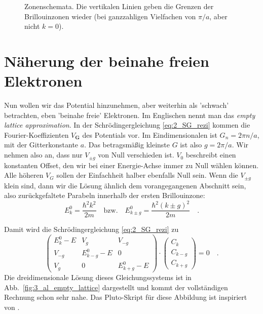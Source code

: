 \begin{figure}
   \caption{Zonenschemata. Die vertikalen Linien geben die Grenzen der Brillouinzonen wieder (bei ganzzahligen Vielfachen von $\pi/a$, aber nicht $k=0$). \label{fig:3_zone_scheme}}
\end{figure}


\section{Näherung der beinahe freien Elektronen}



Nun wollen wir das Potential hinzunehmen, aber weiterhin als 'schwach' betrachten, eben 'beinahe freie' Elektronen. Im Englischen  nennt man das \emph{empty lattice approximation}. In der Schrödingergleichung \ref{eq:2_SG_rezi} kommen die Fourier-Koeffizienten $V_\mathbf{G}$ des Potentials vor. Im Eindimensionalen ist $G_n = 2 \pi n / a$, mit der Gitterkonstante $a$. Das betragsmäßig kleinste $G$ ist also $g = 2 \pi / a$. Wir nehmen also an, dass nur $V_{\pm g}$ von Null verschieden ist. $V_0$ beschreibt einen konstanten Offset, den wir bei einer Energie-Achse immer zu Null wählen können. Alle höheren $V_G$ sollen der Einfachheit halber ebenfalls Null sein.  Wenn die $V_{\pm g}$ klein sind, dann wir die Lösung ähnlich dem vorangegangenen Abschnitt sein, also zurückgefaltete Parabeln innerhalb der ersten Brillouinzone:
\begin{equation}
    E_k^0 =  \frac{\hbar^2 k^2}{2m} \quad \text{bzw.} \quad    E_{k \pm g}^0 =  \frac{\hbar^2 (k  \pm g)^2}{2m}  \quad .
\end{equation}

Damit wird die Schrödingergleichung \ref{eq:2_SG_rezi} zu
\begin{equation}
   \begin{pmatrix}
    E_k^0 - E &  V_{g} &  V_{-g} \\
    V_{-g}  &   E_{k - g}^0 - E & 0  \\
    V_{g}  &  0 &     E_{k + g}^0 - E  
\end{pmatrix}
  \cdot
  \begin{pmatrix}
    C_{k} \\  C_{k - g} \\  C_{k + g}
  \end{pmatrix}
 = 0  \quad . 
 \label{eq:2_SG_empty_lattice} 
\end{equation}
Die dreidimensionale Lösung dieses Gleichungssystems ist in Abb.~\ref{fig:3_al_empty_lattice} dargestellt und kommt der vollständigen Rechnung schon sehr nahe. Das Pluto-Skript  für diese Abbildung ist inspiriert von \cite{Polakovic_cmpm3}.

